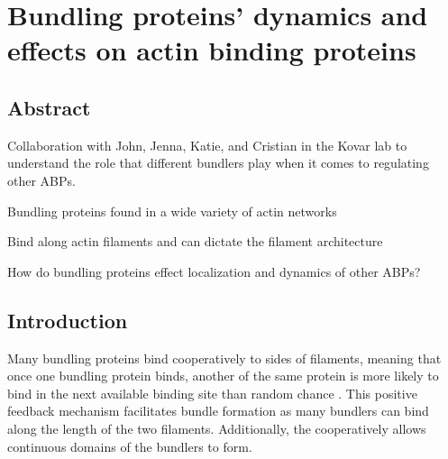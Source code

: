 \chapter{Bundling proteins' dynamics and effects on actin binding proteins}\label{ch:abp-bundle}

\section[Abstract]{Abstract\footnotemark}

Collaboration with John, Jenna, Katie, and Cristian in the Kovar lab to understand the role that different bundlers play when it comes to regulating other ABPs.

Bundling proteins found in a wide variety of actin networks

Bind along actin filaments and can dictate the filament architecture

How do bundling proteins effect localization and dynamics of other ABPs?


\section{Introduction}\label{ch03-introduction}

Many bundling proteins bind cooperatively to sides of filaments, 
meaning that once one bundling protein binds, another of the same 
protein is more likely to bind in the next available binding site 
than random chance \citep{winkelman_fascin-_2016}. This positive 
feedback mechanism facilitates bundle formation as many bundlers can
bind along the length of the two filaments. Additionally, the 
cooperatively allows continuous domains of the bundlers to form.

